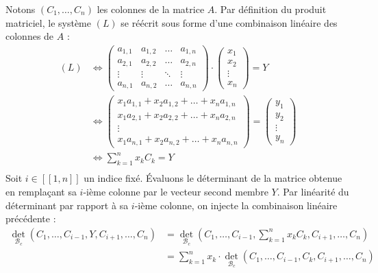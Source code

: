 \documentclass[12pt, a4paper]{report}
\begin{document}
Notons $(C_1, \dots, C_n)$ les colonnes de la matrice $A$. Par définition du produit matriciel, le système $(L)$ se réécrit sous forme d'une combinaison linéaire des colonnes de $A$ :
\begin{align*}
    (L) &\iff 
    \left(\begin{matrix} a_{1,1} & a_{1,2} & \dots & a_{1,n} \\
    a_{2,1} & a_{2,2} & \dots & a_{2,n} \\
    \vdots & \vdots & \ddots & \vdots \\
    a_{n,1} & a_{n,2} & \dots & a_{n,n} \end{matrix}\right) \cdot \left(\begin{matrix} x_1 \\ x_2 \\ \vdots \\ x_n \end{matrix}\right) = Y \\
    &\iff \left(\begin{matrix} x_1 a_{1,1} + x_2 a_{1,2} + \dots + x_n a_{1,n} \\ x_1 a_{2,1} + x_2 a_{2,2} + \dots + x_n a_{2,n} \\ \vdots \\ x_1 a_{n,1} + x_2 a_{n,2} + \dots + x_n a_{n,n} \end{matrix}\right) = \left(\begin{matrix} y_1 \\ y_2 \\ \vdots \\ y_n \end{matrix}\right)
    \\
    &\iff \sum_{k=1}^n x_k C_k = Y \\
\end{align*}
Soit $i \in [\![1,n]\!]$ un indice fixé. Évaluons le déterminant de la matrice obtenue en remplaçant sa $i$-ième colonne par le vecteur second membre $Y$. Par linéarité du déterminant par rapport à sa $i$-ième colonne, on injecte la combinaison linéaire précédente :
\begin{align*}
    \det_{\mathcal{B}_c}(C_1, \dots, C_{i-1}, Y, C_{i+1}, \dots, C_n) &= \det_{\mathcal{B}_c}\left(C_1, \dots, C_{i-1}, \sum_{k=1}^n x_k C_k, C_{i+1}, \dots, C_n\right) \\
    &= \sum_{k=1}^n x_k \cdot \det_{\mathcal{B}_c}(C_1, \dots, C_{i-1}, C_k, C_{i+1}, \dots, C_n)
\end{align*}
\end{document}
